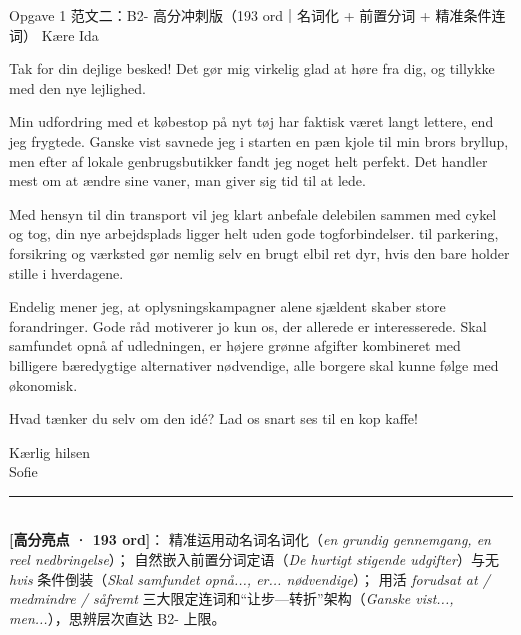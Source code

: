 \begin{emailbox}{Opgave 1 范文二：B2- 高分冲刺版（193 ord｜名词化 + 前置分词 + 精准条件连词）}
Kære Ida

\vspace{0.25em}
Tak for din dejlige besked! Det gør mig virkelig glad at høre fra dig, og tillykke med den nye lejlighed.

\vspace{0.25em}
Min udfordring med et købestop på nyt tøj har faktisk været langt lettere, end jeg frygtede. Ganske vist savnede jeg i starten en pæn kjole til min brors bryllup, men efter  af lokale genbrugsbutikker fandt jeg noget helt perfekt. Det handler mest om at ændre sine vaner,  man giver sig tid til at lede.

\vspace{0.25em}
Med hensyn til din transport vil jeg klart anbefale delebilen sammen med cykel og tog,  din nye arbejdsplads ligger helt uden gode togforbindelser.  til parkering, forsikring og værksted gør nemlig selv en brugt elbil ret dyr, hvis den bare holder stille i hverdagene.

\vspace{0.25em}
Endelig mener jeg, at oplysningskampagner alene sjældent skaber store forandringer. Gode råd motiverer jo kun os, der allerede er interesserede. Skal samfundet opnå  af udledningen, er højere grønne afgifter kombineret med billigere bæredygtige alternativer nødvendige,  alle borgere skal kunne følge med økonomisk.

\vspace{0.25em}
Hvad tænker du selv om den idé? Lad os snart ses til en kop kaffe!

\vspace{0.25em}
Kærlig hilsen\\
Sofie

\vspace{0.3em}
\rule{\linewidth}{0.4pt}\\[0.2em]
\small\textbf{\color{NCDNavy}[高分亮点 · 193 ord]}： 精准运用动名词名词化（\textit{en grundig gennemgang, en reel nedbringelse}）； 自然嵌入前置分词定语（\textit{De hurtigt stigende udgifter}）与无 \textit{hvis} 条件倒装（\textit{Skal samfundet opnå..., er... nødvendige}）； 用活 \textit{forudsat at / medmindre / såfremt} 三大限定连词和“让步—转折”架构（\textit{Ganske vist..., men...}），思辨层次直达 B2- 上限。
\end{emailbox}

